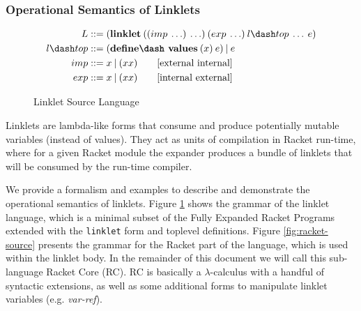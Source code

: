 \twocolumn

\subsubsection{Operational Semantics of Linklets}

\begin{figure}[tbp]
  \begin{mdframed}
    \begin{align*}
      L  &::= (\textbf{linklet}\:((imp\: \ldots)\: \ldots)\:(exp\: \ldots)\:l\dash top\:\ldots\:e)\\
      l\dash top &::= (\textbf{define\dash values}\:(x)\:e)\:|\:e \\
      imp &::= x\:|\:(x x) \tag*{[external internal]}\\
      exp &::= x\:|\:(x x) \tag*{[internal external]}
    \end{align*}
  \caption{Linklet Source Language}
  \label{fig:linklet-source}
  \end{mdframed}
\end{figure}

Linklets are lambda-like forms that consume and produce potentially
mutable variables (instead of values). They act as units of
compilation in Racket run-time, where for a given Racket module the
expander produces a bundle of linklets that will be consumed by the
run-time compiler.

We provide a formalism and examples to describe and demonstrate the
operational semantics of linklets. Figure \ref{fig:linklet-source}
shows the grammar of the linklet language, which is a minimal subset
of the Fully Expanded Racket Programs extended with the \verb|linklet|
form and toplevel definitions. Figure \ref{fig:racket-source} presents
the grammar for the Racket part of the language, which is used within
the linklet body. In the remainder of this document we will call this
sub-language Racket Core (RC). RC is basically a $\lambda$-calculus with a
handful of syntactic extensions, as well as some additional forms to
manipulate linklet variables (e.g. \emph{var-ref}).

